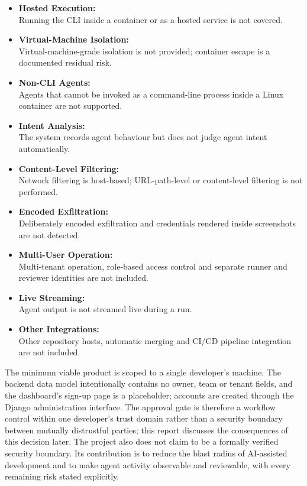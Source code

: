 \documentclass[12pt,a4paper,oneside]{report}
\begin{document}
\begin{itemize}
\item
  \textbf{Hosted Execution:}\\
  Running the CLI inside a container or as a hosted service is not covered.
\item
  \textbf{Virtual-Machine Isolation:}\\
  Virtual-machine-grade isolation is not provided; container escape is a documented residual risk.
\item
  \textbf{Non-CLI Agents:}\\
  Agents that cannot be invoked as a command-line process inside a Linux container are not supported.
\item
  \textbf{Intent Analysis:}\\
  The system records agent behaviour but does not judge agent intent automatically.
\item
  \textbf{Content-Level Filtering:}\\
  Network filtering is host-based; URL-path-level or content-level filtering is not performed.
\item
  \textbf{Encoded Exfiltration:}\\
  Deliberately encoded exfiltration and credentials rendered inside screenshots are not detected.
\item
  \textbf{Multi-User Operation:}\\
  Multi-tenant operation, role-based access control and separate runner and reviewer identities are not included.
\item
  \textbf{Live Streaming:}\\
  Agent output is not streamed live during a run.
\item
  \textbf{Other Integrations:}\\
  Other repository hosts, automatic merging and CI/CD pipeline integration are not included.
\end{itemize}


The minimum viable product is scoped to a single developer's machine. The backend data model intentionally contains no owner, team or tenant fields, and the dashboard's sign-up page is a placeholder; accounts are created through the Django administration interface. The approval gate is therefore a workflow control within one developer's trust domain rather than a security boundary between mutually distrustful parties; this report discusses the consequences of this decision later. The project also does not claim to be a formally verified security boundary. Its contribution is to reduce the blast radius of AI-assisted development and to make agent activity observable and reviewable, with every remaining risk stated explicitly.
\end{document}
